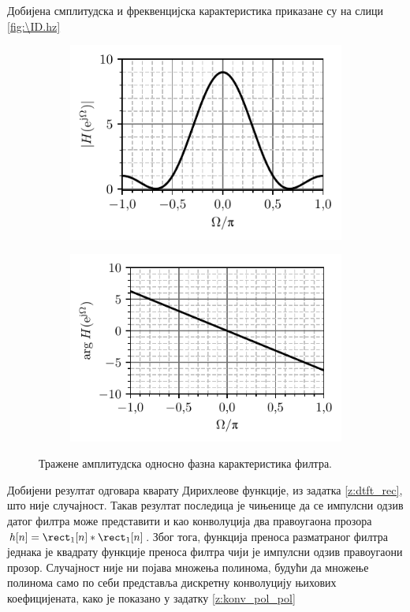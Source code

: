 Добијена смплитудска и фреквенцијска карактеристика приказане су на слици \ref{fig:\ID.hz}
\begin{figure}
    \centering
    \begin{subfigure}{0.49\textwidth}
        \centering
        \includegraphics{fig/zt_tri.pdf}
    \end{subfigure}
    \begin{subfigure}{0.49\textwidth}
        \centering
        \includegraphics{fig/zt_tri_faz.pdf}
    \end{subfigure}
    \caption{Тражене амплитудска односно фазна карактеристика филтра.}
\end{figure}

Добијени резултат одговара кварату Дирихлеове функције, из задатка \ref{z:dtft_rec}, што није случајност. 
Такав резултат последица је чињенице да се импулсни одзив датог филтра може представити и као 
конволуција два правоугаона прозора $h[n] = \rect_1[n] \ast \rect_1[n]$. Због тога, функција преноса 
разматраног филтра једнака је квадрату функције преноса 
филтра чији је импулсни одзив правоугаони прозор. Случајност није ни појава множења полинома, будући да множење полинома само по 
себи представља дискретну конволуцију њихових коефицијената, како је показано у задатку \ref{z:konv_pol_pol}
